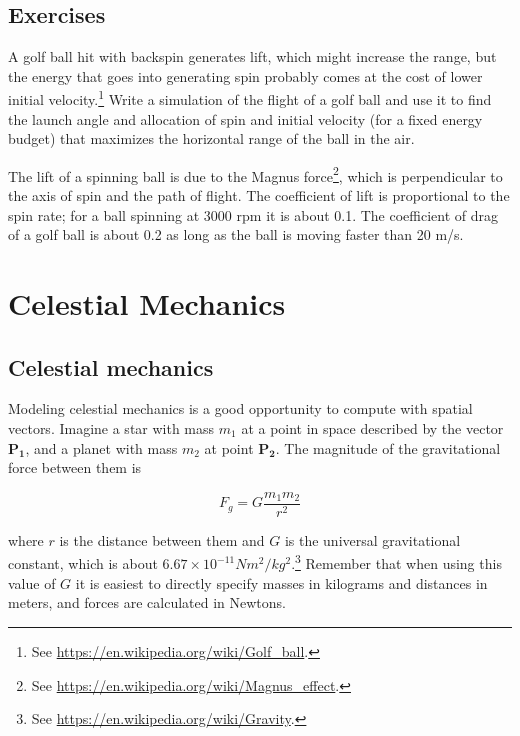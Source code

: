 \documentclass[
]{book}
\renewcommand{\vec}[1]{\bm{\mathbf{#1}}}
\begin{document}
\section{Exercises}

\begin{ex}
\label{ex:golf}

A golf ball hit with backspin
generates lift, which might increase the range, but the energy that
goes into generating spin probably comes at the cost of lower initial
velocity.\footnote{See \url{https://en.wikipedia.org/wiki/Golf_ball}.}
Write a simulation of the flight of a golf ball and use it to find
the launch angle and allocation of spin and initial velocity
(for a fixed energy budget) that maximizes the horizontal range of the
ball in the air.

The lift of a spinning ball is due to the Magnus force\footnote{See
\url{https://en.wikipedia.org/wiki/Magnus_effect}.}, which is
perpendicular to the axis of spin and the path of flight.  The
coefficient of lift is proportional to the spin rate; for a ball
spinning at 3000 rpm it is about 0.1.  The coefficient of drag of a
golf ball is about 0.2 as long as the ball is moving faster than 20 m/s.
\end{ex}



\chapter{Celestial Mechanics}

\section{Celestial mechanics}

Modeling celestial mechanics is a good opportunity
to compute with spatial vectors.
Imagine a star with mass $m_1$ at a point in space described by the
vector $\vec{P_1}$, and a planet with mass $m_2$ at point $\vec{P_2}$.
The magnitude of the gravitational force between them is

\begin{equation}
F_g = G \frac{m_1 m_2}{r^2}
\end{equation}

where $r$ is the distance between them and $G$ is the universal
gravitational constant, which is about $6.67 \times 10^{-11} N m^2 /
kg^2$.\footnote{See \url{https://en.wikipedia.org/wiki/Gravity}.}
Remember that when using this
value of $G$ it is easiest to directly specify
masses
in kilograms and distances in meters, and forces are calculated in Newtons.
\end{document}

